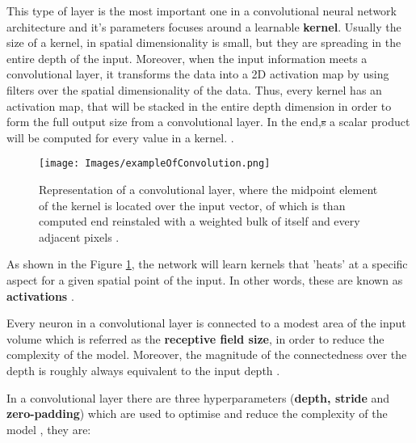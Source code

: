 This type of layer is the most important one in a convolutional neural network architecture and it's parameters focuses around a learnable \textbf{kernel}. Usually the size of a kernel, in spatial dimensionality is small, but they are spreading in the entire depth of the input. Moreover, when the input information meets a convolutional layer, it transforms the data into a 2D activation map by using filters over the spatial dimensionality of the data. Thus, every kernel has an activation map, that will be stacked in the entire depth dimension in order to form the full output size from a convolutional layer. In the end,\sout{s} a scalar product will be computed for every value in a kernel. \cite{IntroCNN, EvalPooling}.\par

\begin{figure}[h!]
    \centering
    \texttt{[image: Images/exampleOfConvolution.png]}
    \caption{Representation of a convolutional layer, where the midpoint element of the kernel is located over the input vector, of which is than computed end reinstaled with a weighted bulk of itself and every adjacent pixels \cite{IntroCNN}.}
    \label{fig:ex_conv}
\end{figure}

As shown in the Figure \ref{fig:ex_conv}, the network will learn kernels that 'heats' at a specific aspect for a given spatial point of the input. In other words, these are known as \textbf{activations} \cite{IntroCNN}. \par

Every neuron in a convolutional layer is connected to a modest area of the input volume  which is referred as the \textbf{receptive field size}, in order to reduce the complexity of the model. Moreover, the magnitude of the connectedness over the depth is roughly always equivalent to the input depth \cite{IntroCNN, EvalPooling}. \par 

In a convolutional layer there are three hyperparameters (\textbf{depth, stride} and \textbf{zero-padding}) which are used to optimise and reduce the complexity of the model \cite{IntroCNN}, they are:

